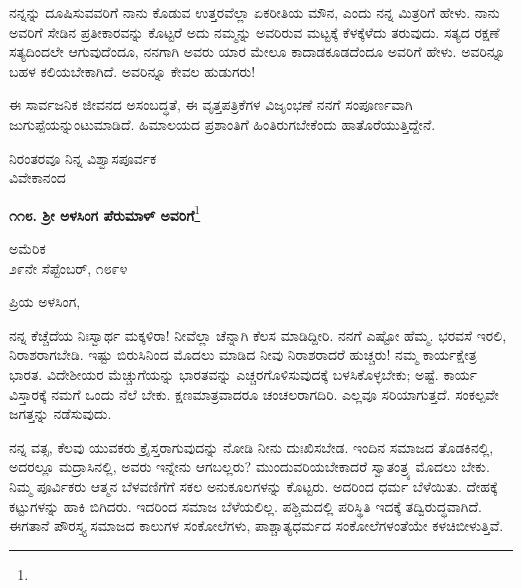 ನನ್ನನ್ನು ದೂಷಿಸುವವರಿಗೆ ನಾನು ಕೊಡುವ ಉತ್ತರವೆಲ್ಲಾ ಏಕರೀತಿಯ ಮೌನ, ಎಂದು ನನ್ನ ಮಿತ್ರರಿಗೆ ಹೇಳು. ನಾನು ಅವರಿಗೆ ಸೇಡಿನ ಪ್ರತೀಕಾರವನ್ನು ಕೊಟ್ಟರೆ ಅದು ನಮ್ಮನ್ನು ಅವರಿರುವ ಮಟ್ಟಕ್ಕೆ ಕೆಳಕ್ಕೆಳೆದು ತರುವುದು. ಸತ್ಯದ ರಕ್ಷಣೆ ಸತ್ಯದಿಂದಲೇ ಆಗುವುದೆಂದೂ, ನನಗಾಗಿ ಅವರು ಯಾರ ಮೇಲೂ ಕಾದಾಡಕೂಡದೆಂದೂ ಅವರಿಗೆ ಹೇಳು. ಅವರಿನ್ನೂ ಬಹಳ ಕಲಿಯಬೇಕಾಗಿದೆ. ಅವರಿನ್ನೂ ಕೇವಲ ಹುಡುಗರು!

ಈ ಸಾರ್ವಜನಿಕ ಜೀವನದ ಅಸಂಬದ್ಧತೆ, ಈ ವೃತ್ತಪತ್ರಿಕೆಗಳ ವಿಜೃಂಭಣೆ ನನಗೆ ಸಂಪೂರ್ಣವಾಗಿ ಜುಗುಪ್ಪೆಯನ್ನುಂಟುಮಾಡಿದೆ. ಹಿಮಾಲಯದ ಪ್ರಶಾಂತಿಗೆ ಹಿಂತಿರುಗಬೇಕೆಂದು ಹಾತೊರೆಯುತ್ತಿದ್ದೇನೆ.

\vspace{-0.5cm}

{\flushright
ನಿರಂತರವೂ ನಿನ್ನ ವಿಶ್ವಾಸಪೂರ್ವಕ\\ವಿವೇಕಾನಂದ\par}

\begin{center}
\textbf{೧೧೮. ಶ‍್ರೀ ಅಳಸಿಂಗ ಪೆರುಮಾಳ್ ಅವರಿಗೆ}\footnote{}
\end{center}

\vspace{-0.5cm}

\begin{flushright}
ಅಮೆರಿಕ\\೨೯ನೇ ಸೆಪ್ಟೆಂಬರ್, ೧೮೯೪
\end{flushright}

\vspace{-0.5cm}

\noindent
ಪ್ರಿಯ ಅಳಸಿಂಗ,

ನನ್ನ ಕೆಚ್ಚೆದೆಯ ನಿಃಸ್ವಾರ್ಥ ಮಕ್ಕಳಿರಾ! ನೀವೆಲ್ಲಾ ಚೆನ್ನಾಗಿ ಕೆಲಸ ಮಾಡಿದ್ದೀರಿ. ನನಗೆ ಎಷ್ಟೋ ಹೆಮ್ಮ. ಭರವಸೆ ಇರಲಿ, ನಿರಾಶರಾಗಬೇಡಿ. ಇಷ್ಟು ಬಿರುಸಿನಿಂದ ಮೊದಲು ಮಾಡಿದ ನೀವು ನಿರಾಶರಾದರೆ ಹುಚ್ಚರು! ನಮ್ಮ ಕಾರ್ಯಕ್ಷೇತ್ರ ಭಾರತ. ವಿದೇಶೀಯರ ಮೆಚ್ಚುಗೆಯನ್ನು ಭಾರತವನ್ನು ಎಚ್ಚರಗೊಳಿಸುವುದಕ್ಕೆ ಬಳಸಿಕೊಳ್ಳಬೇಕು; ಅಷ್ಟೆ. ಕಾರ್ಯ ವಿಸ್ತಾರಕ್ಕೆ ನಮಗೆ ಒಂದು ನೆಲೆ ಬೇಕು. ಕ್ಷಣಮಾತ್ರವಾದರೂ ಚಂಚಲರಾಗದಿರಿ. ಎಲ್ಲವೂ ಸರಿಯಾಗುತ್ತದೆ. ಸಂಕಲ್ಪವೇ ಜಗತ್ತನ್ನು ನಡೆಸುವುದು.

ನನ್ನ ವತ್ಸ, ಕೆಲವು ಯುವಕರು ಕ್ರೈಸ್ತರಾಗುವುದನ್ನು ನೋಡಿ ನೀನು ದುಃಖಿಸಬೇಡ. ಇಂದಿನ ಸಮಾಜದ ತೊಡಕಿನಲ್ಲಿ, ಅದರಲ್ಲೂ ಮದ್ರಾಸಿನಲ್ಲಿ, ಅವರು ಇನ್ನೇನು ಆಗಬಲ್ಲರು? ಮುಂದುವರಿಯಬೇಕಾದರೆ ಸ್ವಾತಂತ್ರ್ಯ ಮೊದಲು ಬೇಕು. ನಿಮ್ಮ ಪೂರ್ವಿಕರು ಆತ್ಮನ ಬೆಳವಣಿಗೆಗೆ ಸಕಲ ಅನುಕೂಲಗಳನ್ನು ಕೊಟ್ಟರು. ಅದರಿಂದ ಧರ್ಮ ಬೆಳೆಯಿತು. ದೇಹಕ್ಕೆ ಕಟ್ಟುಗಳನ್ನು ಹಾಕಿ ಬಿಗಿದರು. ಇದರಿಂದ ಸಮಾಜ ಬೆಳೆಯಲಿಲ್ಲ. ಪಶ್ಚಿಮದಲ್ಲಿ ಪರಿಸ್ಥಿತಿ ಇದಕ್ಕೆ ತದ್ವಿರುದ್ಧವಾಗಿದೆ. ಈಗತಾನೆ ಪೌರಸ್ತ್ಯ ಸಮಾಜದ ಕಾಲುಗಳ ಸಂಕೋಲೆಗಳು, ಪಾಶ್ಚಾತ್ಯಧರ್ಮದ ಸಂಕೋಲೆಗಳಂತೆಯೇ ಕಳಚಿಬೀಳುತ್ತಿವೆ.

